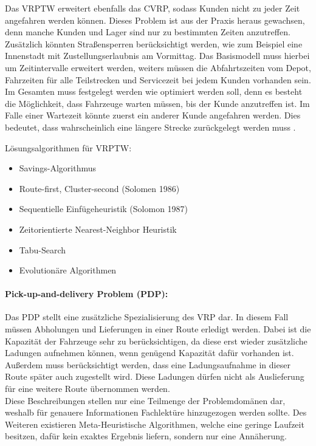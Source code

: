 Das VRPTW erweitert ebenfalls das CVRP, sodass Kunden nicht zu jeder Zeit angefahren werden können.
Dieses Problem ist aus der Praxis heraus gewachsen, denn manche Kunden und Lager sind nur zu bestimmten Zeiten anzutreffen. 
Zusätzlich könnten Straßensperren berücksichtigt werden, wie zum Beispiel eine Innenstadt mit Zustellungserlaubnis am Vormittag. 
Das Basismodell muss hierbei um Zeitintervalle erweitert werden, weiters müssen die Abfahrtszeiten vom Depot, Fahrzeiten für alle Teilstrecken und Servicezeit bei jedem Kunden vorhanden sein. 
Im Gesamten muss festgelegt werden wie optimiert werden soll, denn es besteht die Möglichkeit, dass Fahrzeuge warten müssen, bis der Kunde anzutreffen ist. 
Im Falle einer Wartezeit könnte zuerst ein anderer Kunde angefahren werden. 
Dies bedeutet, dass wahrscheinlich eine längere Strecke zurückgelegt werden muss \cite{wurzer2010fallbeispiele}. 

\noindent
Lösungsalgorithmen für VRPTW:
\begin{itemize}
	\item Savings-Algorithmus
	\item Route-first, Cluster-second (Solomen 1986)
	\item Sequentielle Einfügeheuristik (Solomon 1987)
	\item Zeitorientierte Nearest-Neighbor Heuristik 
	\item Tabu-Search
	\item Evolutionäre Algorithmen
\end{itemize} 

\paragraph{Pick-up-and-delivery Problem (PDP):}

Das PDP stellt eine zusätzliche Spezialisierung des VRP dar. 
In diesem Fall müssen Abholungen und Lieferungen in einer Route erledigt werden. 
Dabei ist die Kapazität der Fahrzeuge sehr zu berücksichtigen, da diese erst wieder zusätzliche Ladungen aufnehmen können, wenn genügend Kapazität dafür vorhanden ist. 
Außerdem muss berücksichtigt werden, dass eine Ladungsaufnahme in dieser Route später auch zugestellt wird. 
Diese Ladungen dürfen nicht als Auslieferung für eine weitere Route übernommen werden. \\

\noindent
Diese Beschreibungen stellen nur eine Teilmenge der Problemdomänen dar, weshalb für genauere Informationen Fachlektüre hinzugezogen werden sollte. 
Des Weiteren existieren Meta-Heuristische Algorithmen, welche eine geringe Laufzeit besitzen, dafür kein exaktes Ergebnis liefern, sondern nur eine Annäherung. 

